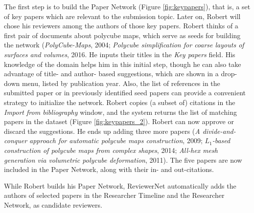 The first step is to build the Paper Network (Figure \ref{fig:keypapers}), that is, a set of key papers which are relevant to the submission topic. Later on, Robert will chose his reviewers among the authors of those key papers. Robert  thinks of a first pair of documents about polycube maps, which serve as seeds for building the network (\emph{PolyCube-Maps}, 2004; \emph{Polycube simplification for coarse layouts of surfaces and volumes}, 2016.  %
He inputs their titles in the \emph{Key papers} field. His knowledge of the domain helps him in this initial step, though he can also take advantage of title- and author- based suggestions, which are shown in a drop-down menu, listed by publication year. Also, the list of references in the submitted paper or in previously identified seed papers can provide a convenient strategy to initialize the network. Robert copies (a subset of) citations in the \emph{Import from bibliography} window, and the system returns the list of matching papers in the dataset (Figure \ref{fig:keypapers_2}). Robert can now approve or discard the suggestions. He ends up adding three more papers (\emph{A divide-and-conquer approach for automatic polycube maps construction}, 2009; \emph{$L_1$-based construction of polycube maps from complex shapes}, 2014; \emph{All-hex mesh generation via volumetric polycube deformation}, 2011). 
The five papers are now included in the Paper Network, along with their in- and out-citations. 
 
While Robert builds his Paper Network, ReviewerNet automatically adds the authors of selected papers in the Researcher Timeline and the Researcher Network, as candidate reviewers.

